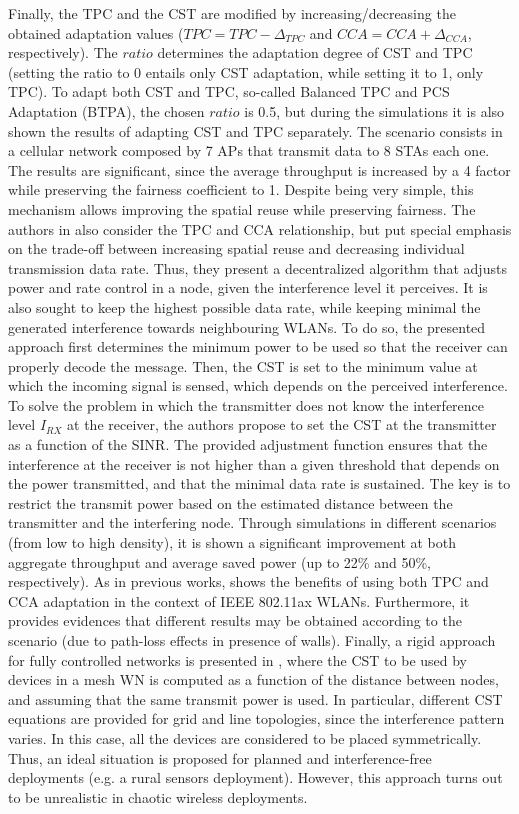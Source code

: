 \documentclass[12pt, a4paper,twoside]{tesi_upf}
\begin{document}
			Finally, the TPC and the CST are modified by increasing/decreasing the obtained adaptation values ($TPC = TPC - \Delta_{TPC}$ and $CCA = CCA + \Delta_{CCA}$, respectively). The $ratio$ determines the adaptation degree of CST and TPC (setting the ratio to 0 entails only CST adaptation, while setting it to 1, only TPC). To adapt both CST and TPC, so-called Balanced TPC and PCS Adaptation (BTPA), the chosen $ratio$ is 0.5, but during the simulations it is also shown the results of adapting CST and TPC separately. The scenario consists in a cellular network composed by 7 APs that transmit data to 8 STAs each one.	The results are significant, since the average throughput is increased by a 4 factor while preserving the fairness coefficient to 1. Despite being very simple, this mechanism allows improving the spatial reuse while preserving fairness. The authors in \cite{kim2006improving} also consider the TPC and CCA relationship, but put special emphasis on the trade-off between increasing spatial reuse and decreasing individual transmission data rate. Thus, they present a decentralized algorithm that adjusts power and rate control in a node, given the interference level it perceives. It is also sought to keep the highest possible data rate, while keeping minimal the generated interference towards neighbouring WLANs. To do so, the presented approach first determines the minimum power to be used so that the receiver can properly decode the message. Then, the CST is set to the minimum value at which the incoming signal is sensed, which depends on the perceived interference. To solve the problem in which the transmitter does not know the interference level $I_{RX}$ at the receiver, the authors propose to set the CST at the transmitter as a function of the SINR. The provided adjustment function ensures that the interference at the receiver is not higher than a given threshold that depends on the power transmitted, and that the minimal data rate is sustained. The key is to restrict the transmit power based on the estimated distance between the transmitter and the interfering node. Through simulations in different scenarios (from low to high density), it is shown a significant improvement at both aggregate throughput and average saved power (up to 22\% and 50\%, respectively). As in previous works, \cite{oteri2015improved} shows the benefits of using both TPC and CCA adaptation in the context of IEEE 802.11ax WLANs. Furthermore, it provides evidences that different results may be obtained according to the scenario (due to path-loss effects in presence of walls). Finally, a rigid approach for fully controlled networks is presented in \cite{zhu2004leveraging}, where the CST to be used by devices in a mesh WN is computed as a function of the distance between nodes, and assuming that the same transmit power is used. In particular, different CST equations are provided for grid and line topologies, since the interference pattern varies. In this case, all the devices are considered to be placed symmetrically. Thus, an ideal situation is proposed for planned and interference-free deployments (e.g. a rural sensors deployment). However, this approach turns out to be unrealistic in chaotic wireless deployments.
			
\end{document}
